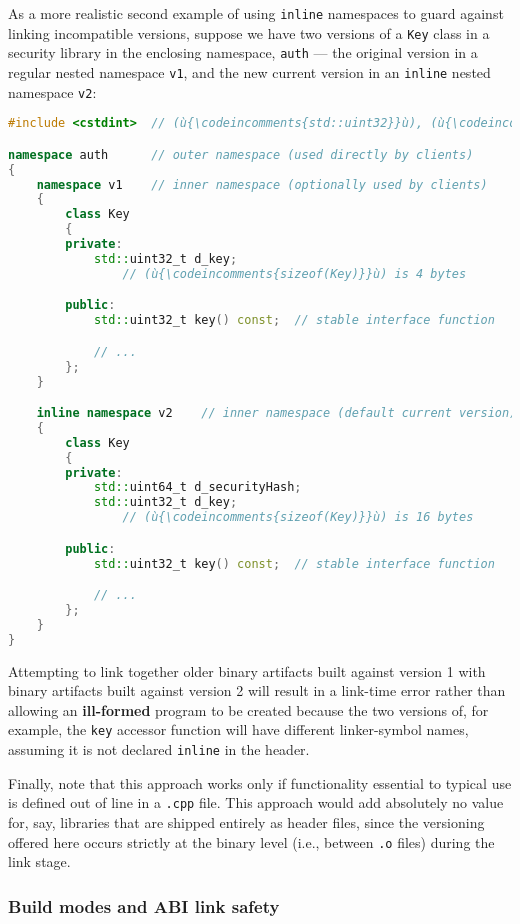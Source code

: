 As a more realistic second example of using \texttt{inline} namespaces
to guard against linking incompatible versions, suppose we have two
versions of a \texttt{Key} class in a security library in the enclosing
namespace, \texttt{auth} --- the original version in a regular nested
namespace \texttt{v1}, and the new current version in an \texttt{inline}
nested namespace \texttt{v2}:

\begin{lstlisting}[language=C++]
#include <cstdint>  // (ù{\codeincomments{std::uint32}}ù), (ù{\codeincomments{std::unit64}}ù)

namespace auth      // outer namespace (used directly by clients)
{
    namespace v1    // inner namespace (optionally used by clients)
    {
        class Key
        {
        private:
            std::uint32_t d_key;
                // (ù{\codeincomments{sizeof(Key)}}ù) is 4 bytes

        public:
            std::uint32_t key() const;  // stable interface function

            // ...
        };
    }

    inline namespace v2    // inner namespace (default current version)
    {
        class Key
        {
        private:
            std::uint64_t d_securityHash;
            std::uint32_t d_key;
                // (ù{\codeincomments{sizeof(Key)}}ù) is 16 bytes

        public:
            std::uint32_t key() const;  // stable interface function

            // ...
        };
    }
}
\end{lstlisting}

\noindent Attempting to link together older binary artifacts built against version
1 with binary artifacts built against version 2 will result in a
link-time error rather than allowing an \textbf{ill-formed} program to
be created because the two versions of, for example, the \texttt{key}
accessor function will have different linker-symbol names, assuming it
is not declared \texttt{inline} in the header.

Finally, note that this approach works only if functionality essential
to typical use is defined out of line in a \texttt{.cpp} file. This
approach would add absolutely no value for, say, libraries that are
shipped entirely as header files, since the versioning offered here
occurs strictly at the binary level (i.e., between \texttt{.o} files)
during the link stage.

\subsubsection[Build modes and ABI link safety]{Build modes and ABI link safety}\label{build-modes-and-abi-link-safety}

